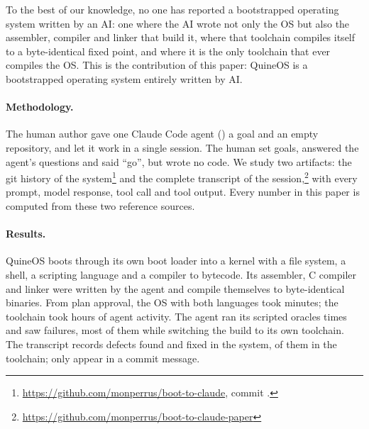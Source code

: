 \documentclass{article}
\newcommand{\sysname}{QuineOS}
\begin{document}
To the best of our knowledge, no one has reported a
bootstrapped operating system written by an AI: one where the AI wrote not only the OS
but also the assembler, compiler and linker that build it, where that toolchain compiles
itself to a byte-identical fixed point, and where it is the only toolchain that ever
compiles the OS. This is the contribution of this paper: \sysname{} is a bootstrapped operating system entirely written by AI.

\paragraph{Methodology.} The human author gave one Claude Code agent (\sessionmodel{}) a goal
and an empty repository, and let it work in a single session. The human set goals,
answered the agent's questions and said ``go'', but wrote no code. We study two
artifacts: the git history of the
system\footnote{\url{https://github.com/monperrus/boot-to-claude}, commit \ospin{}.} and
the complete transcript of the
session,\footnote{\url{https://github.com/monperrus/boot-to-claude-paper}} with every
prompt, model response, tool call and tool output. Every number in this paper is computed from these two reference sources.

\paragraph{Results.} \sysname{} boots through its own boot loader into a kernel with a
file system, a shell, a scripting language and a compiler to bytecode. Its assembler, C
compiler and linker were written by the agent and compile themselves to byte-identical
binaries. From plan approval, the OS with both languages took \plantoosmin{} minutes;
the toolchain took \tcactivehours{} hours of agent activity. The agent ran its
scripted oracles \noraclesruns{} times and saw \noraclesfailed{} failures, most of them
while switching the build to its own toolchain. The transcript records \ntproduct{}
defects found and fixed in the system, \nttoolchain{} of them in the toolchain; only
\ntreported{} appear in a commit message.
\end{document}
